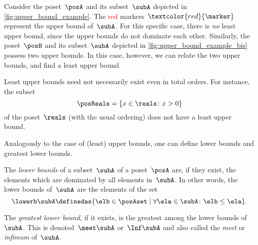 \begin{example}
	Consider the poset~$\posA$ and its subset~$\subA$ depicted in \cref{fig:upper_bound_example}.
	The \textcolor{red}{red} markers~$\textcolor{red}{\marker}$ represent the upper bound of~$\subA$.
	For this specific case, there is \emph{no} least upper bound, since the upper bounds do not dominate each other.
	Similarly, the poset~$\posB$ and its subset~$\subA$ depicted in \cref{fig:upper_bound_example_bis} possess two upper bounds.
	In this case, however, we can relate the two upper bounds, and find a least upper bound.
\end{example}

\begin{figure*}[h!]
	\caption{}
\end{figure*}
\begin{example}
	Least upper bounds need not necessarily exist even in total orders.
	For instance, the subset
	\begin{equation*}
		\posReals = \{x\in \reals \colon x>0\}
	\end{equation*}
	of the poset~$\reals$ (with the usual ordering) does not have a least upper bound.
\end{example}

Analogously to the case of (least) upper bounds, one can define lower bounds and greatest lower bounds.

\begin{ctdefinition}
	\label{def:greatest-lower-bound}
	The \emph{lower bounds} of a subset~$\subA$ of a poset~$\posA$ are, if they exist, the elements which are dominated by all elements in~$\subA$.
	In other words, the lower bounds of~$\subA$ are the elements of the set
	\begin{equation*}
		\lowerb \subA\definedas \{ \elb \in \posAset \mid \forall \ela \in \subA  \colon \elb \leq \ela \}.
	\end{equation*}
\end{ctdefinition}

\begin{ctdefinition}
	The \emph{greatest lower bound}, if it exists, is the greatest among the lower bounds of~$\subA$.
	This is denoted~$\meet \subA$ or~$\Inf \subA$ and also called the \emph{meet} or \emph{infimum} of~$\subA$.
\end{ctdefinition}

